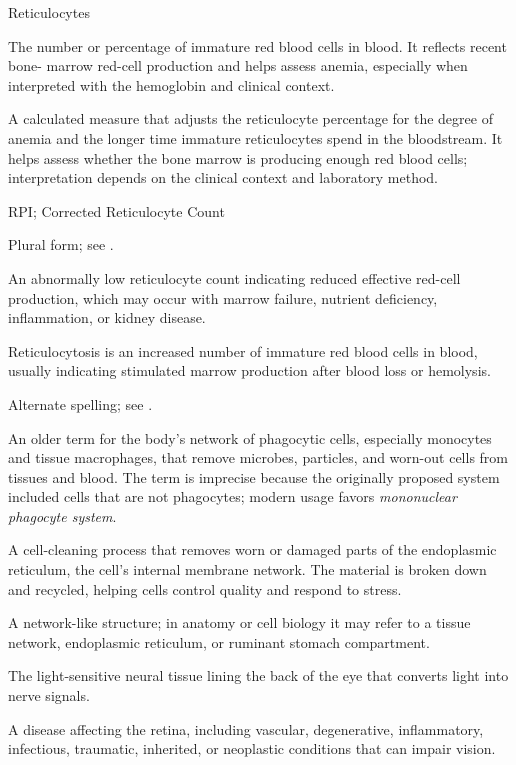 \synonyms
Reticulocytes

 The number or percentage of immature red blood cells in blood. It reflects recent bone-
marrow red-cell production and helps assess anemia, especially when interpreted with the hemoglobin and clinical context.

 A calculated measure that adjusts the reticulocyte percentage for the degree of anemia and the longer time immature reticulocytes spend in the bloodstream. It helps assess whether the bone marrow is producing enough red blood cells; interpretation depends on the clinical context and laboratory method.

\synonyms
RPI; Corrected Reticulocyte Count

 Plural form; see .

 An abnormally low reticulocyte count indicating reduced effective red-cell production, which may occur with marrow failure, nutrient deficiency, inflammation, or kidney disease.

 Reticulocytosis is an increased number of immature red blood cells in blood, usually indicating stimulated marrow production after blood loss or hemolysis.

 Alternate spelling; see .

 An older term for the body's network of phagocytic cells, especially monocytes and tissue macrophages, that remove microbes, particles, and worn-out cells from tissues and blood. The term is imprecise because the originally proposed system included cells that are not phagocytes; modern usage favors \textit{mononuclear phagocyte system}.

 A cell-cleaning process that removes worn or damaged parts of the endoplasmic reticulum, the cell's internal membrane network. The material is broken down and recycled, helping cells control quality and respond to stress.

 A network-like structure; in anatomy or cell biology it may refer to a tissue network, endoplasmic reticulum, or ruminant stomach compartment.

 The light-sensitive neural tissue lining the back of the eye that converts light into nerve signals.

 A disease affecting the retina, including vascular, degenerative, inflammatory, infectious, traumatic, inherited, or neoplastic conditions that can impair vision.

